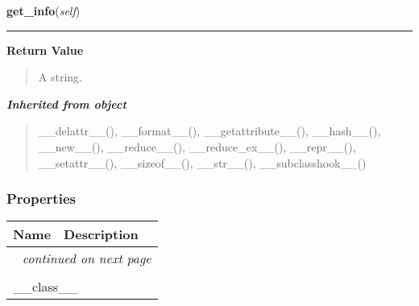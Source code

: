     \vspace{0.5ex}

\hspace{.8\funcindent}\begin{boxedminipage}{\funcwidth}

    \raggedright \textbf{get\_info}(\textit{self})

    \vspace{-1.5ex}

    \rule{\textwidth}{0.5\fboxrule}
\setlength{\parskip}{2ex}
\setlength{\parskip}{1ex}
      \textbf{Return Value}
    \vspace{-1ex}

      \begin{quote}
      A string.

      \end{quote}

    \end{boxedminipage}


\large{\textbf{\textit{Inherited from object}}}

\begin{quote}
\_\_delattr\_\_(), \_\_format\_\_(), \_\_getattribute\_\_(), \_\_hash\_\_(), \_\_new\_\_(), \_\_reduce\_\_(), \_\_reduce\_ex\_\_(), \_\_repr\_\_(), \_\_setattr\_\_(), \_\_sizeof\_\_(), \_\_str\_\_(), \_\_subclasshook\_\_()
\end{quote}


  \subsubsection{Properties}

    \vspace{-1cm}
\hspace{\varindent}\begin{longtable}{|p{\varnamewidth}|p{\vardescrwidth}|l}
\cline{1-2}
\cline{1-2} \centering \textbf{Name} & \centering \textbf{Description}& \\
\cline{1-2}
\endhead\cline{1-2}\multicolumn{3}{r}{\small\textit{continued on next page}}\\\endfoot\cline{1-2}
\endlastfoot\multicolumn{2}{|l|}{\textit{Inherited from object}}\\
\multicolumn{2}{|p{\varwidth}|}{\raggedright \_\_class\_\_}\\
\cline{1-2}
\end{longtable}

